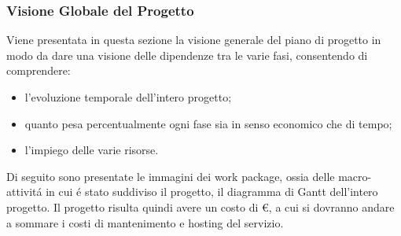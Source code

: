 \subsubsection{Visione Globale del Progetto}
Viene presentata in questa sezione la visione generale del piano di progetto in modo da
dare una visione delle dipendenze tra le varie fasi, consentendo di comprendere:
\begin{itemize}
\item l'evoluzione temporale dell'intero progetto;
\item quanto pesa percentualmente ogni fase sia in senso economico che di tempo;
\item l'impiego delle varie risorse.
\end{itemize}
Di seguito sono presentate le immagini dei work package, ossia delle macro-attivit\'a in cui
\'e stato suddiviso il progetto, il diagramma di Gantt dell'intero progetto.
Il progetto risulta quindi avere un costo di \euro{}, a cui si dovranno andare a
sommare i costi di mantenimento e hosting del servizio.

